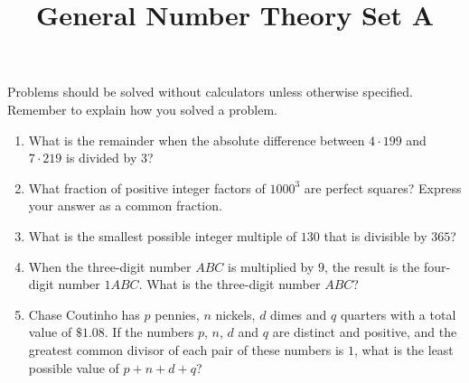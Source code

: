\documentclass{article}
\title{General Number Theory Set A}
\date{}
\author{}
\begin{document}
\maketitle

\noindent Problems should be solved without calculators unless otherwise specified.
Remember to explain how you solved a problem.
\begin{multicols}{2}
    \begin{enumerate}
        \item What is the remainder when the absolute difference between $4 \cdot 199$ and $7 \cdot 219$ is divided by $3$?
            \vspace{3cm}
        \item What fraction of positive integer factors of $1000^3$ are perfect squares?
            Express your answer as a common fraction.
            \vspace{3cm}
        \item What is the smallest possible integer multiple of $130$ that is divisible by $365$?
            \vspace{3cm}
        \item When the three-digit number $ABC$ is multiplied by $9$, the result is the four-digit number $1ABC$.
            What is the three-digit number $ABC$?
            \vspace{3cm}
        \item Chase Coutinho has $p$ pennies, $n$ nickels, $d$ dimes and $q$ quarters with a total value of $\$1.08$.
            If the numbers $p$, $n$, $d$ and $q$ are distinct and positive, and the greatest common divisor of each pair of these numbers is $1$, what is the least possible value of $p + n + d + q$?
            \vspace{3cm}
    \end{enumerate}
\end{multicols}
\end{document}
